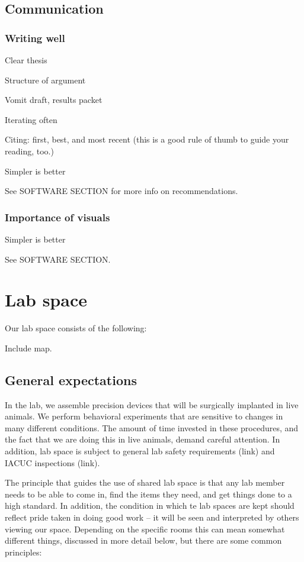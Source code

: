 \documentclass{tufte-book}
\begin{document}
\section{Communication}

\subsection{Writing well}

Clear thesis

Structure of argument

Vomit draft, results packet

Iterating often

Citing: first, best, and most recent (this is a good rule of thumb to
guide your reading, too.)

Simpler is better

See SOFTWARE SECTION for more info on recommendations.

\subsection{Importance of visuals}

Simpler is better

See SOFTWARE SECTION.


\chapter{Lab space}

Our lab space consists of the following:

Include map.

\section{General expectations}

In the lab, we assemble precision devices that will be surgically
implanted in live animals. We perform behavioral experiments that are
sensitive to changes in many different conditions. The amount of time
invested in these procedures, and the fact that we are doing this in
live animals, demand careful attention. In addition, lab space is
subject to general lab safety requirements (link) and IACUC
inspections (link).

The principle that guides the use of shared lab space is that any lab
member needs to be able to come in, find the items they need, and get
things done to a high standard. In addition, the condition in which te
lab spaces are kept should reflect pride taken in doing good work --
it will be seen and interpreted by others viewing our space.
Depending on the specific rooms this can mean somewhat different
things, discussed in more detail below, but there are some common
principles:
\end{document}
